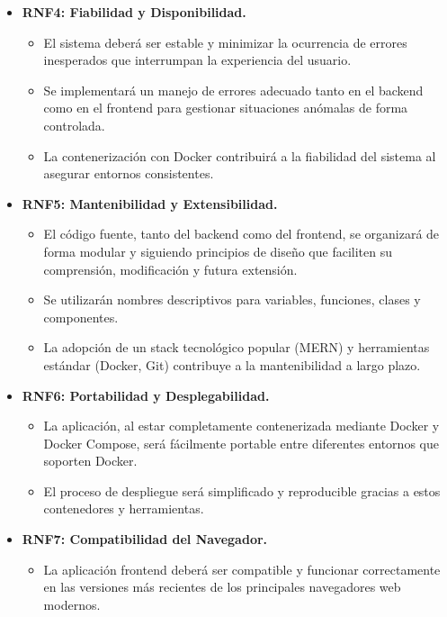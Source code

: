 \begin{itemize}
\begin{itemize}
        \item El frontend se optimizará (ej. mediante el proceso de build de Vite) para asegurar una carga inicial rápida y una experiencia fluida.
    \end{itemize}
    \vspace{0.3cm}
    \item \textbf{RNF4: Fiabilidad y Disponibilidad.}
    \begin{itemize}
        \item El sistema deberá ser estable y minimizar la ocurrencia de errores inesperados que interrumpan la experiencia del usuario.
        \item Se implementará un manejo de errores adecuado tanto en el backend como en el frontend para gestionar situaciones anómalas de forma controlada.
        \item La contenerización con Docker contribuirá a la fiabilidad del sistema al asegurar entornos consistentes.
    \end{itemize}
    \vspace{0.3cm}
    \item \textbf{RNF5: Mantenibilidad y Extensibilidad.}
    \begin{itemize}
        \item El código fuente, tanto del backend como del frontend, se organizará de forma modular y siguiendo principios de diseño que faciliten su comprensión, modificación y futura extensión.
        \item Se utilizarán nombres descriptivos para variables, funciones, clases y componentes.
        \item La adopción de un stack tecnológico popular (MERN) y herramientas estándar (Docker, Git) contribuye a la mantenibilidad a largo plazo.
    \end{itemize}
    \vspace{0.3cm}
    \item \textbf{RNF6: Portabilidad y Desplegabilidad.}
    \begin{itemize}
        \item La aplicación, al estar completamente contenerizada mediante Docker y Docker Compose, será fácilmente portable entre diferentes entornos que soporten Docker.
        \item El proceso de despliegue será simplificado y reproducible gracias a estos contenedores y herramientas.
    \end{itemize}
    \vspace{0.3cm}
    \item \textbf{RNF7: Compatibilidad del Navegador.}
    \begin{itemize}
        \item La aplicación frontend deberá ser compatible y funcionar correctamente en las versiones más recientes de los principales navegadores web modernos.
    \end{itemize}
\end{itemize}

